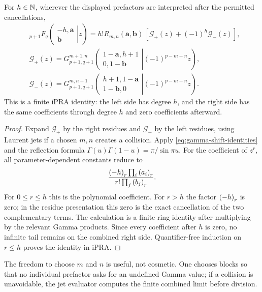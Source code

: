 \begin{theorem}\label{thm:polynomial-repair}
For $h\in\mathbb N$, wherever the displayed prefactors are interpreted after the
permitted cancellations,
\begin{align}
&{}_{p+1}F_q\!\left(\left.\begin{matrix}-h,\mathbf a\\\mathbf b\end{matrix}\right|z\right)
=h!R_{m,n}(\mathbf a,\mathbf b)\,[\mathcal G_+(z)+(-1)^h\mathcal G_-(z)],
\label{eq:poly-repair}\\
&\mathcal G_+(z)=G_{p+1,q+1}^{m+1,n}\!\left(
 \left.\begin{matrix}1-\mathbf a,h+1\\0,1-\mathbf b\end{matrix}\right|
 (-1)^{p-m-n}z\right),\\
&\mathcal G_-(z)=G_{p+1,q+1}^{m,n+1}\!\left(
 \left.\begin{matrix}h+1,1-\mathbf a\\1-\mathbf b,0\end{matrix}\right|
 (-1)^{p-m-n}z\right).
\end{align}
This is a finite iPRA identity: the left side has degree $h$, and the right side
has the same coefficients through degree $h$ and zero coefficients afterward.
\end{theorem}
\begin{proof}
Expand $\mathcal G_+$ by the right residues and $\mathcal G_-$ by the left
residues, using Laurent jets if a chosen $m,n$ creates a collision.  Apply
\eqref{eq:gamma-shift-identities} and the reflection formula
$\Gamma(u)\Gamma(1-u)=\pi/\sin\pi u$.  For the coefficient of $z^r$, all
parameter-dependent constants reduce to
\[
 \frac{\left(-h\right)_{r}\prod_i\left(a_i\right)_{r}}
      {r!\prod_j\left(b_j\right)_{r}}.
\]
For $0\le r\le h$ this is the polynomial coefficient.  For $r>h$ the factor
$\left(-h\right)_{r}$ is zero; in the residue presentation this zero is the exact
cancellation of the two complementary terms.  The calculation is a finite
ring identity after multiplying by the relevant Gamma products.  Since every
coefficient after $h$ is zero, no infinite tail remains on the combined right
side.  Quantifier-free induction on $r\le h$ proves the identity in iPRA.
\end{proof}

\begin{remark}
The freedom to choose $m$ and $n$ is useful, not cosmetic.  One chooses blocks
so that no individual prefactor asks for an undefined Gamma value; if a
collision is unavoidable, the jet evaluator computes the finite combined
limit before division.
\end{remark}
